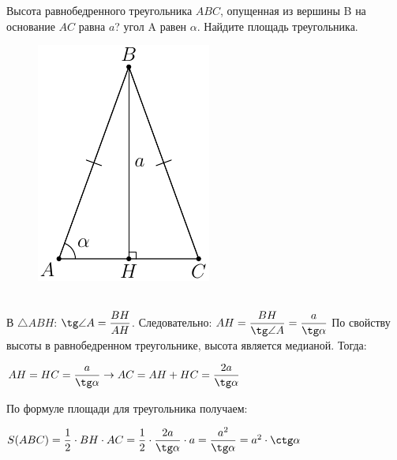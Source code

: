  Высота равнобедренного треугольника $ABC$, опущенная из вершины B на основание $AC$ равна $a$? угол A равен $\alpha$. Найдите площадь треугольника.
\begin{figure}[h]
\centering
\includegraphics[scale =1.0]{pic18.pdf}
\end{figure}\\

\Solution
 В $\triangle ABH$: $\tg\angle A =\dfrac{BH}{AH}$. Следовательно: $AH=\dfrac{BH}{\tg\angle A}=\dfrac{a}{\tg\alpha}$
По свойству высоты в равнобедренном треугольнике, высота является медианой. Тогда:
\begin{center}$
AH=HC=\dfrac{a}{\tg\alpha}\rightarrow AC=AH+HC=\dfrac{2a}{\tg\alpha}
 $\end{center}
По формуле площади для треугольника получаем:
\begin{center}$
S(ABC)=\dfrac{1}{2}\cdot BH\cdot AC=\dfrac{1}{2}\cdot\dfrac{2a}{\tg\alpha}\cdot a=\dfrac{a^2}{\tg\alpha}=a^2\cdot\ctg\alpha
 $\end{center}


